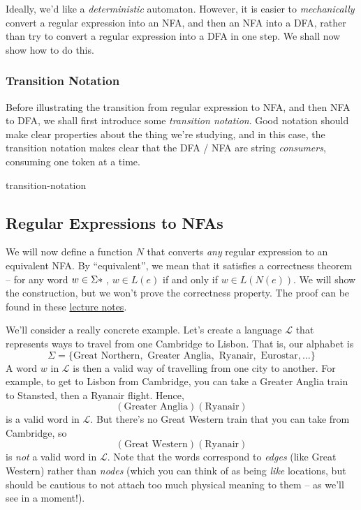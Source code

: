 Ideally, we'd like a \emph{deterministic} automaton. However, it is easier to \emph{mechanically} convert a regular expression into an NFA, and then an NFA into a DFA, rather than try to convert a regular expression into a DFA in one step. We shall now show how to do this.

\subsubsection{Transition Notation}
Before illustrating the transition from regular expression to NFA, and then NFA to DFA, we shall first introduce some \emph{transition notation}. Good notation should make clear properties about the thing we're studying, and in this case, the transition notation makes clear that the DFA / NFA are string \emph{consumers}, consuming one token at a time. 

\begin{center}
    {transition-notation}
\end{center}

\subsection{Regular Expressions to NFAs}
We will now define a function $N$ that converts \textit{any} regular expression to an equivalent NFA. By ``equivalent'', we mean that it satisfies a correctness theorem -- for any word $w \in \Sigma\*$, $w \in L(e)$ if and only if $w \in L(N(e))$. We will show the construction, but we won't prove the correctness property. The proof can be found in these \href{https://courses.engr.illinois.edu/cs373/fa2013/Lectures/lec07.pdf}{lecture notes}.

We'll consider a really concrete example. Let's create a language $\mathcal{L}$ that represents ways to travel from one Cambridge to Lisbon. That is, our alphabet is 
\[ \Sigma = \{ \text{Great Northern}, \text{ Greater Anglia}, \text{ Ryanair}, \text{ Eurostar}, \ldots\} \]
A word $w$ in $\mathcal{L}$ is then a valid way of travelling from one city to another. For example, to get to Lisbon from Cambridge, you can take a Greater Anglia train to Stansted, then a Ryanair flight. Hence, 
\[(\text{Greater Anglia})(\text{Ryanair})\]
is a valid word in $\mathcal{L}$.
But there's no Great Western train that you can take from Cambridge, so 
\[(\text{Great Western})(\text{Ryanair})\]
is \textit{not} a valid word in $\mathcal{L}$. Note that the words correspond to \emph{edges} (like Great Western) rather than \emph{nodes} (which you can think of as being \emph{like} locations, but should be cautious to not attach too much physical meaning to them -- as we'll see in a moment!).

